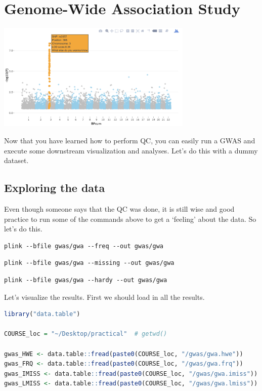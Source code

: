 \documentclass[
]{book}
\begin{document}
\hypertarget{gwas-testing}{%
\chapter{Genome-Wide Association Study}\label{gwas-testing}}

\includegraphics[width=0.7\textwidth,height=\textheight]{./img/_gwas/interactive_plot.png}

Now that you have learned how to perform QC, you can easily run a GWAS and execute some downstream visualization and analyses. Let's do this with a dummy dataset.

\hypertarget{exploring-the-data}{%
\section{Exploring the data}\label{exploring-the-data}}

Even though someone says that the QC was done, it is still wise and good practice to run some of the commands above to get a `feeling' about the data. So let's do this.

\begin{lstlisting}
plink --bfile gwas/gwa --freq --out gwas/gwa
\end{lstlisting}

\begin{lstlisting}
plink --bfile gwas/gwa --missing --out gwas/gwa
\end{lstlisting}

\begin{lstlisting}
plink --bfile gwas/gwa --hardy --out gwas/gwa
\end{lstlisting}

Let's visualize the results. First we should load in all the results.

\begin{lstlisting}[language=R]
library("data.table")

COURSE_loc = "~/Desktop/practical"  # getwd()

gwas_HWE <- data.table::fread(paste0(COURSE_loc, "/gwas/gwa.hwe"))
gwas_FRQ <- data.table::fread(paste0(COURSE_loc, "/gwas/gwa.frq"))
gwas_IMISS <- data.table::fread(paste0(COURSE_loc, "/gwas/gwa.imiss"))
gwas_LMISS <- data.table::fread(paste0(COURSE_loc, "/gwas/gwa.lmiss"))
\end{lstlisting}
\end{document}
